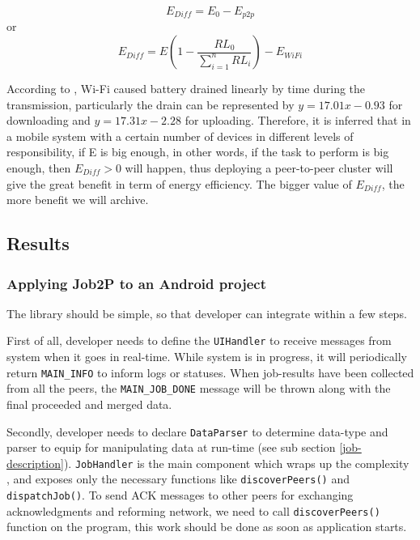 \documentclass[conference]{IEEEtran}
\begin{document}
$$E_{Diff} = E_{0} - E_{p2p}$$ or $$E_{Diff} = E(1 - \frac{RL_{0}}{\sum_{i=1}^{n}{RL_{i}}}) - E_{WiFi}$$

According to \cite{wifi_energy}, Wi-Fi caused battery drained linearly by time during the transmission, particularly the drain can be represented by $y = 17.01x - 0.93$ for downloading and $y = 17.31x - 2.28$ for uploading. Therefore, it is inferred that in a mobile system with a certain number of devices in different levels of responsibility, if E is big enough, in other words, if the task to perform is big enough, then $E_{Diff} > 0$ will happen, thus deploying a peer-to-peer cluster will give the great benefit in term of energy efficiency. The bigger value of $E_{Diff}$, the more benefit we will archive.

\subsection{Results}

\subsubsection{Applying Job2P to an Android project}
The library should be simple, so that developer can integrate within a few steps.

First of all, developer needs to define the \texttt{UIHandler} to receive messages from system when it goes in real-time. While system is in progress, it will periodically return \texttt{MAIN\_INFO} to inform logs or statuses. When job-results have been collected from all the peers, the \texttt{MAIN\_JOB\_DONE} message will be thrown along with the final proceeded and merged data.\\


\noindent {}

Secondly, developer needs to declare \texttt{DataParser} to determine data-type and parser to equip for manipulating data at run-time (see sub section \ref{job-description}). \texttt{JobHandler} is the main component which wraps up the complexity , and exposes only the necessary functions like \texttt{discoverPeers()} and \texttt{dispatchJob()}. To send ACK messages to other peers for exchanging acknowledgments and reforming network, we need to call \texttt{discoverPeers()} function on the program, this work should be done as soon as application starts. 
\end{document}
